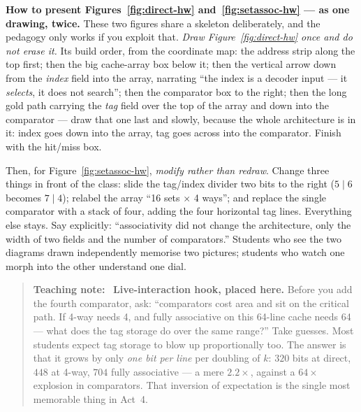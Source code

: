 \documentclass[11pt]{article}
\newenvironment{teachingaside}{\begin{quote}\small\color{primary-gold}\textbf{Teaching note:}\ }{\end{quote}}
\begin{document}
\textbf{How to present Figures~\ref{fig:direct-hw} and~\ref{fig:setassoc-hw} --- as one drawing, twice.} These two figures share a skeleton deliberately, and the pedagogy only works if you exploit that. \emph{Draw Figure~\ref{fig:direct-hw} once and do not erase it.} Its build order, from the coordinate map: the address strip along the top first; then the big cache-array box below it; then the vertical arrow down from the \emph{index} field into the array, narrating ``the index is a decoder input --- it \emph{selects}, it does not search''; then the comparator box to the right; then the long gold path carrying the \emph{tag} field over the top of the array and down into the comparator --- draw that one last and slowly, because the whole architecture is in it: index goes down into the array, tag goes across into the comparator. Finish with the hit/miss box.

Then, for Figure~\ref{fig:setassoc-hw}, \emph{modify rather than redraw}. Change three things in front of the class: slide the tag/index divider two bits to the right ($5\mid 6$ becomes $7\mid 4$); relabel the array ``16 sets $\times$ 4 ways''; and replace the single comparator with a stack of four, adding the four horizontal tag lines. Everything else stays. Say explicitly: ``associativity did not change the architecture, only the width of two fields and the number of comparators.'' Students who see the two diagrams drawn independently memorise two pictures; students who watch one morph into the other understand one dial.

\begin{teachingaside}
\textbf{Live-interaction hook, placed here.} Before you add the fourth comparator, ask: ``comparators cost area and sit on the critical path. If 4-way needs 4, and fully associative on this 64-line cache needs 64 --- what does the tag storage do over the same range?'' Take guesses. Most students expect tag storage to blow up proportionally too. The answer is that it grows by only \emph{one bit per line} per doubling of $k$: $320$ bits at direct, $448$ at 4-way, $704$ fully associative --- a mere $2.2\times$, against a $64\times$ explosion in comparators.  That inversion of expectation is the single most memorable thing in Act~4.
\end{teachingaside}
\end{document}
